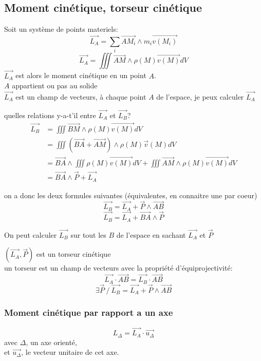 \documentclass[../main.tex]{subfile}
\begin{document}
\subsection{Moment cinétique, torseur cinétique}
\begin{defi}
	Soit un système de points materiels:\\
	$$\vec{L_A} = \sum\limits_i \vec{AM_i} \wedge m_i \vec{v(M_i)}$$
	$$\vec{L_A} = \iiint \vec{AM} \wedge \rho(M) \vec{v(M)} dV$$
	$\vec{L_A}$ est alors le moment cinétique en un point $A$.\\
	$A$ appartient ou pas au solide\\

	$\vec{L_A}$ est un champ de vecteurs, à chaque point $A$ de l'espace, je peux calculer $\vec{L_A}$
\end{defi}

\begin{propri}
	quelles relations y-a-t'il entre $\vec{L_A}$ et $\vec{L_B}$?\\
	$$
\begin{aligned}
	\vec{L_B} &= \iiint \vec{BM} \wedge \rho (M) \vec{v(M)} dV\\
	&= \iiint (\vec{BA} + \vec{AM}) \wedge \rho(M) \vec{v}(M) dV\\
	&= \vec{BA} \wedge \iiint \rho(M) \vec{v(M)} dV + \iiint \vec{AM} \wedge \rho(M)\vec{v(M)} dV\\
	&= \vec{BA} \wedge \vec{P} + \vec{L_A}
\end{aligned}
	$$

	on a donc les deux formules suivantes (équivalentes, en connaitre une par coeur)
	$$\vec{L_B} = \vec{L_A} + \vec{P} \wedge \vec{AB}$$
	$$\vec{L_B} = \vec{L_A} + \vec{BA} \wedge \vec{P}$$

	On peut calculer $\vec{L_B}$ sur tout les $B$ de l'espace en sachant $\vec{L_A}$ et $\vec{P}$
\end{propri}

\begin{defi}
	$(\vec{L_A}, \vec{P})$ est un torseur cinétique\\
	un torseur est un champ de vecteurs avec la propriété d'équiprojectivité:\\
	$$\vec{L_A} \cdot \vec{AB} = \vec{L_B} \cdot \vec{AB}$$
	$$\exists \vec{P} \ / \ \vec{L_B} = \vec{L_A} + \vec{P} \wedge \vec{AB}$$
\end{defi}

\subsubsection{Moment cinétique par rapport a un axe}
$$L_\Delta = \vec{L_A} \cdot \vec{u_\Delta}$$
avec $\Delta$, un axe orienté, \\
et $\vec{u_{\Delta}}$, le vecteur unitaire de cet axe.
\end{document}
